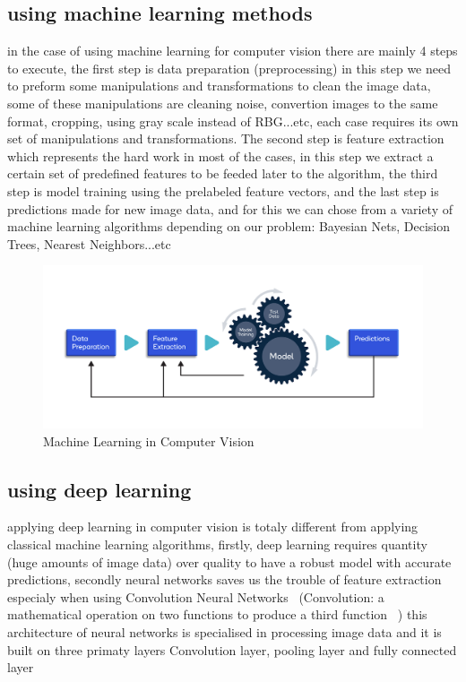     \subsection{using machine learning methods}
        in the case of using machine learning for computer vision there are mainly 4 steps to execute, the first step is data preparation (preprocessing) in this step we need to preform some manipulations and transformations to clean the image data, some of these manipulations are cleaning noise, convertion images to the same format, cropping, using gray scale instead of RBG...etc, each case requires its own set of manipulations and transformations. The second step is feature extraction which represents the hard work in most of the cases, in this step we extract a certain set of predefined features to be feeded later to the algorithm, the third step is model training using the prelabeled feature vectors, and the last step is predictions made for new image data, and for this we can chose from a variety of machine learning algorithms depending on our problem: Bayesian Nets, Decision Trees, Nearest Neighbors...etc ~\cite{mldlcv}
        \begin{figure}[htbp]
        \begin{center}
        \includegraphics[width=12cm]{./chapter-02-general-ai-information/machine-learning-cv.png}
        \end{center}
        \caption{Machine Learning in Computer Vision ~\cite{mldlcv}}
        \label{fig:mldlcv}
        \end{figure}
    \subsection{using deep learning} 
        applying deep learning in computer vision is totaly different from applying classical machine learning algorithms, firstly,  deep learning requires quantity (huge amounts of image data) over quality to have a robust model with accurate predictions, secondly neural networks saves us the trouble of feature extraction especialy when using Convolution Neural Networks ~\cite{machine-learning-full-scale}(Convolution: a mathematical operation on two functions to produce a third function ~\cite{machine-learning-ibm}) this architecture of neural networks is specialised in processing image data and it is built on three primaty layers Convolution layer, pooling layer and fully connected layer  ~\cite{mldlcv}


